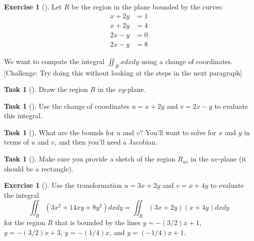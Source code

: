 \documentclass[10pt,]{book}
\theoremstyle{plain}
\theoremstyle{definition}
\theoremstyle{definition}
\theoremstyle{definition}
\theoremstyle{definition}
\newtheorem{exploration}[project]{Exercise}
\newtheorem{task}[project]{Task}
\theoremstyle{definition}
\numberwithin{equation}{section}
\newcommand{\amp}{&}
\begin{document}
\begin{exploration}[]\label{exploration-270}
Let \(R\) be the region in the plane bounded by the curves:%
\begin{align*}
x+2y\amp =1\\
x+2y\amp =4\\
2x-y\amp =0\\
2x-y\amp =8
\end{align*}
%
\par
We want to compute the integral \(\iint_R xdxdy\) using a change of coordinates. [Challenge: Try doing this without looking at the steps in the next paragraph]%
\begin{task}[]\label{task-732}
Draw the region \(R\) in the \(xy\)-plane.%
\end{task}
\begin{task}[]\label{task-733}
Use the change of coordinates \(u=x+2y\) and \(v=2x-y\) to evaluate this integral.%
\end{task}
\begin{task}[]\label{task-734}
What are the bounds for \(u\) and \(v\)?  You'll want to solve for \(x\) and \(y\) in terms of \(u\) and \(v\), and then you'll need a Jacobian.%
\end{task}
\begin{task}[]\label{task-735}
Make sure you provide a sketch of the region \(R_{uv}\) in the \(uv\)-plane (it should be a rectangle).%
\end{task}
\end{exploration}
\begin{exploration}[]\label{exploration-271}
Use the transformation \(u=3x+2y\) and \(v=x+4y\) to evaluate the integral%
\begin{equation*}
\iint_R (3x^2+14xy+8y^2)dxdy =\iint_R (3x+2y)(x+4y)dxdy
\end{equation*}
for the region \(R\) that is bounded by the lines \(y=-(3/2)x+1\), \(y=-(3/2)x+3\), \(y=-(1/4)x\), and \(y=(-1/4)x+1\).%
\end{exploration}
\typeout{************************************************}
\typeout{************************************************}
\end{document}
